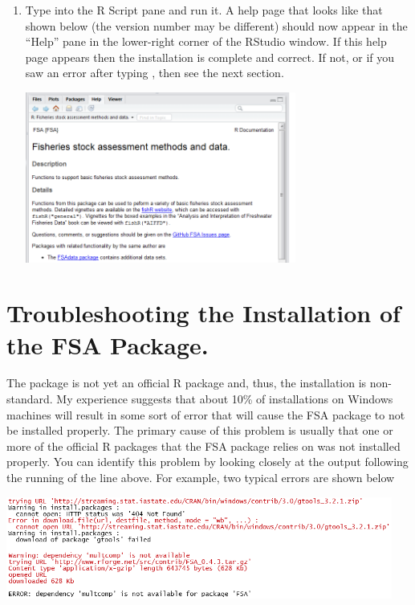 \documentclass{article}\usepackage[]{graphicx}\usepackage[]{color}
\begin{document}
\begin{enumerate}
  \item Type  into the R Script pane and run it.  A help page that looks like that shown below (the version number may be different) should now appear in the ``Help'' pane in the lower-right corner of the RStudio window.  If this help page appears then the installation is complete and correct.  If not, or if you saw an error after typing , then see the next section.
\begin{center}
  \includegraphics[width=3.5in]{Figs/RStudio_Prep_FSAHelp.png}
\end{center}
\end{enumerate}

\section{Troubleshooting the Installation of the FSA Package.}
The  package is not yet an official R package and, thus, the installation is non-standard.  My experience suggests that about 10\% of installations on Windows machines will result in some sort of error that will cause the FSA package to not be installed properly.  The primary cause of this problem is usually that one or more of the official R packages that the FSA package relies on was not installed properly.  You can identify this problem by looking closely at the output following the running of the  line above.  For example, two typical errors are shown below

\begin{center}
  \includegraphics[width=5in]{Figs/RStudio_Prep_FSAInstallErrors.png}
\end{center}
\end{document}
